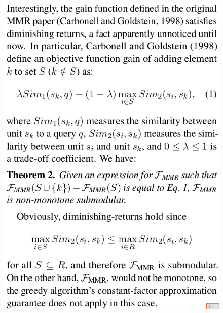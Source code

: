 \documentclass[xcolor={table}]{beamer}
\begin{document}
\begin{frame}[t]{\cite{lin2011class}}
      \begin{figure}[h]
      \includegraphics[scale=.26]{images/mmr-lin11.png} \\
  \end{figure}
\end{frame}
\end{document}
